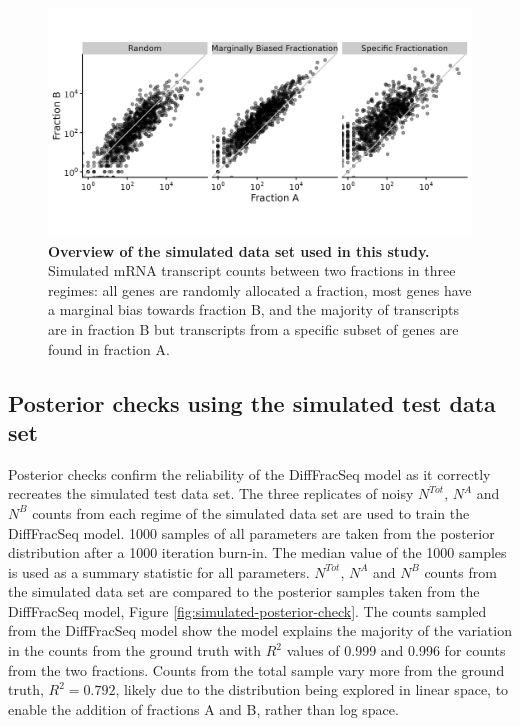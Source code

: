 \documentclass[../main.tex]{subfiles}
\begin{document}
\begin{figure}

{\centering \includegraphics[width=0.8\linewidth]{figures/fractionation_simulated_dataset_summary.png} 

}

\caption[Summary of the simulated test data set.]{\textbf{Overview of the simulated data set used in this study.} Simulated mRNA transcript counts between two fractions in three regimes: all genes are randomly allocated a fraction, most genes have a marginal bias towards fraction B, and the majority of transcripts are in fraction B but transcripts from a specific subset of genes are found in fraction A.} \label{fig:fractionation-simulated-datasets}
\end{figure}

\subsection{Posterior checks using the simulated test data set}

Posterior checks confirm the reliability of the DiffFracSeq model as it correctly recreates the simulated test data set. 
The three replicates of noisy $N^{Tot}$, $N^{A}$ and $N^{B}$ counts from each regime of the simulated data set are used to train the DiffFracSeq model.
1000 samples of all parameters are taken from the posterior distribution after a 1000 iteration burn-in.
The median value of the 1000 samples is used as a summary statistic for all parameters.
$N^{Tot}$, $N^{A}$ and $N^{B}$ counts from the simulated data set are compared to the posterior samples taken from the DiffFracSeq model, Figure \ref{fig:simulated-posterior-check}. 
The counts sampled from the DiffFracSeq model show the model explains the majority of the variation in the counts from the ground truth with $R^2$ values of 0.999 and 0.996 for counts from the two fractions.
Counts from the total sample vary more from the ground truth, $R^2 = 0.792$, likely due to the distribution being explored in linear space, to enable the addition of fractions A and B, rather than log space.
\end{document}
